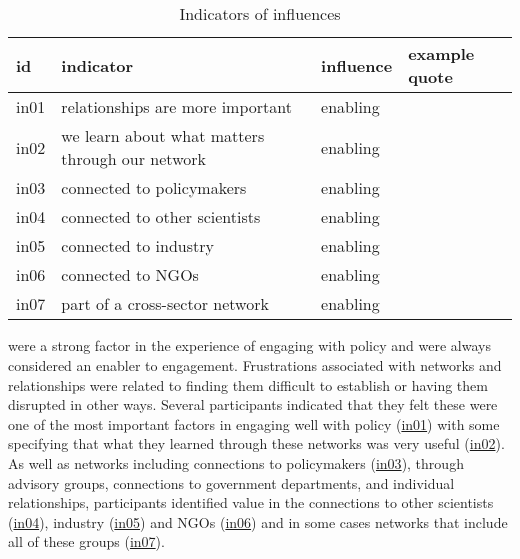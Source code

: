 \subsection{\titnetw}\label{sec:resskinetw}

\begin{table}[!ht]
\footnotesize
\caption{Indicators of \skinetw{} influences}\label{tab:resskinetw}
\begin{tabular}{L{.07\linewidth}L{.3\linewidth}L{.11\linewidth}L{.52\linewidth}} \hline
\textbf{id} & \textbf{indicator} & \textbf{influence} & \textbf{example quote} \\ \hline \hline 
in01 & relationships are more important & enabling &  \\[5mm]
in02 & we learn about what matters through our network & enabling &  \\[5mm]
in03 & connected to policymakers & enabling &  \\[5mm]
in04 & connected to other scientists & enabling &  \\[5mm]
in05 & connected to industry & enabling &  \\[5mm]
in06 & connected to NGOs & enabling &  \\[5mm]
in07 & part of a cross-sector network & enabling &  \\[5mm]
\hline
\end{tabular}
\end{table}

\skinetw{} were a strong factor in the experience of engaging with policy and were always considered an enabler to engagement. Frustrations associated with networks and relationships were related to finding them difficult to establish or having them disrupted in other ways. Several participants indicated that they felt these were one of the most important factors in engaging well with policy (\hyperref[tab:resskinetw]{in01}) with some specifying that what they learned through these networks was very useful (\hyperref[tab:resskinetw]{in02}). As well as networks including connections to policymakers (\hyperref[tab:resskinetw]{in03}), through advisory groups, connections to government departments, and individual relationships, participants identified value in the connections to other scientists (\hyperref[tab:resskinetw]{in04}), industry (\hyperref[tab:resskinetw]{in05}) and NGOs (\hyperref[tab:resskinetw]{in06}) and in some cases networks that include all of these groups (\hyperref[tab:resskinetw]{in07}).

